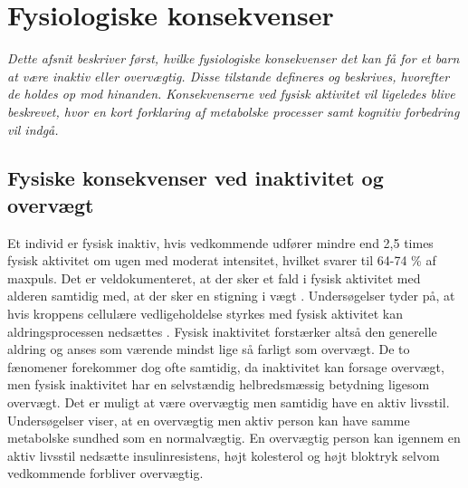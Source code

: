 \section{Fysiologiske konsekvenser}\label{sec:fysio}
\textit{Dette afsnit beskriver først, hvilke fysiologiske konsekvenser det kan få for et barn at være inaktiv eller overvægtig. Disse tilstande defineres og beskrives, hvorefter de holdes op mod hinanden. Konsekvenserne ved fysisk aktivitet vil ligeledes blive beskrevet, hvor en kort forklaring af metabolske processer samt kognitiv forbedring vil indgå.}

\subsection{Fysiske konsekvenser ved inaktivitet og overvægt}\label{subsec:inover}
Et individ er fysisk inaktiv, hvis vedkommende udfører mindre end 2,5 times fysisk aktivitet om ugen med moderat intensitet, hvilket svarer til 64-74 \% af maxpuls. \citep{Kiens2007} Det er veldokumenteret, at der sker et fald i fysisk aktivitet med alderen samtidig med, at der sker en stigning i vægt \citep{Kaprio2008}. Undersøgelser tyder på, at hvis kroppens cellulære vedligeholdelse styrkes med fysisk aktivitet kan aldringsprocessen nedsættes \citep{Knight2012}. Fysisk inaktivitet forstærker altså den generelle aldring og anses som værende mindst lige så farligt som overvægt. De to fænomener forekommer dog ofte samtidig, da inaktivitet kan forsage overvægt, men fysisk inaktivitet har en selvstændig helbredsmæssig betydning ligesom overvægt. Det er muligt at være overvægtig men samtidig have en aktiv livsstil. \citep{Kiens2007,Kaprio2008,Hjort1997} Undersøgelser viser, at en overvægtig men aktiv person kan have samme metabolske sundhed som en normalvægtig. En overvægtig person kan igennem en aktiv livsstil nedsætte insulinresistens, højt kolesterol og højt bloktryk selvom vedkommende forbliver overvægtig. \citep{Lunau2012,Marcelino2012}

